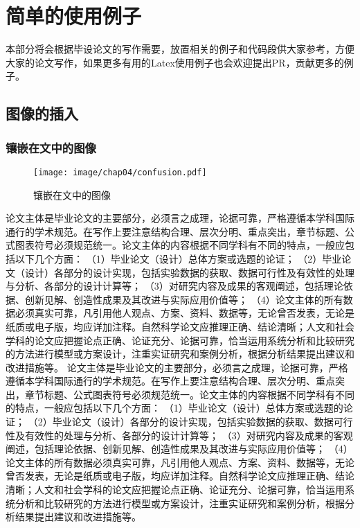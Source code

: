 \chapter{简单的使用例子}
\label{cha:usage-example}

本部分将会根据毕设论文的写作需要，放置相关的例子和代码段供大家参考，方便大家的论文写作，如果更多有用的Latex使用例子也会欢迎提出PR，贡献更多的例子。

\section{图像的插入}

\subsection{镶嵌在文中的图像}
\begin{wrapfigure}{r}{0.5\linewidth}
    \centering
    \texttt{[image: image/chap04/confusion.pdf]}
    \caption{镶嵌在文中的图像}
    \label{fig:image-embedding-text}
\end{wrapfigure}
论文主体是毕业论文的主要部分，必须言之成理，论据可靠，严格遵循本学科国际通行的学术规范。在写作上要注意结构合理、层次分明、重点突出，章节标题、公式图表符号必须规范统一。论文主体的内容根据不同学科有不同的特点，一般应包括以下几个方面： （1）毕业论文（设计）总体方案或选题的论证； （2）毕业论文（设计）各部分的设计实现，包括实验数据的获取、数据可行性及有效性的处理与分析、各部分的设计计算等； （3）对研究内容及成果的客观阐述，包括理论依据、创新见解、创造性成果及其改进与实际应用价值等； （4）论文主体的所有数据必须真实可靠，凡引用他人观点、方案、资料、数据等，无论曾否发表，无论是纸质或电子版，均应详加注释。自然科学论文应推理正确、结论清晰；人文和社会学科的论文应把握论点正确、论证充分、论据可靠，恰当运用系统分析和比较研究的方法进行模型或方案设计，注重实证研究和案例分析，根据分析结果提出建议和改进措施等。
论文主体是毕业论文的主要部分，必须言之成理，论据可靠，严格遵循本学科国际通行的学术规范。在写作上要注意结构合理、层次分明、重点突出，章节标题、公式图表符号必须规范统一。论文主体的内容根据不同学科有不同的特点，一般应包括以下几个方面： （1）毕业论文（设计）总体方案或选题的论证； （2）毕业论文（设计）各部分的设计实现，包括实验数据的获取、数据可行性及有效性的处理与分析、各部分的设计计算等； （3）对研究内容及成果的客观阐述，包括理论依据、创新见解、创造性成果及其改进与实际应用价值等； （4）论文主体的所有数据必须真实可靠，凡引用他人观点、方案、资料、数据等，无论曾否发表，无论是纸质或电子版，均应详加注释。自然科学论文应推理正确、结论清晰；人文和社会学科的论文应把握论点正确、论证充分、论据可靠，恰当运用系统分析和比较研究的方法进行模型或方案设计，注重实证研究和案例分析，根据分析结果提出建议和改进措施等。



